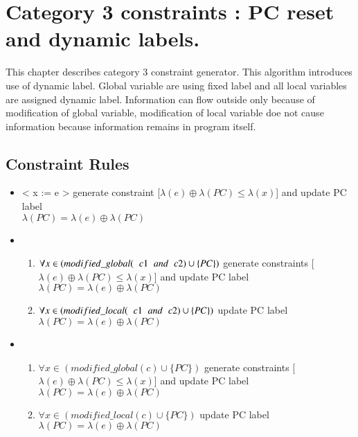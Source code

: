 \chapter{Category 3 constraints : PC reset and dynamic labels.}
\label{ch:c3}
This chapter describes category 3 constraint generator. This algorithm introduces use of dynamic label. Global variable are using fixed label and all local variables are assigned dynamic label. Information can flow outside only because of modification of global variable, modification of local variable doe not cause information because information remains in program itself.   
\section{Constraint Rules}
\begin{itemize}
	\item < x := e > generate constraint [$\lambda(e)\oplus\lambda(PC)\le\lambda(x)$] and update PC label\\ $\lambda(PC) = \lambda(e)\oplus\lambda(PC)$ 
	\item < if e then c1 else c2> \begin{enumerate}
		\item $\forall  x \in ( modified\_global(\hspace{0.2cm} c1 \hspace{0.2cm}and \hspace{0.2cm} c2) \cup \{PC\} )$ generate constraints [$\lambda(e)\oplus\lambda(PC)\le\lambda(x)$] and update PC label $\lambda(PC) = \lambda(e)\oplus\lambda(PC)$
		\item $\forall x \in ( modified\_local(\hspace{0.2cm} c1 \hspace{0.2cm}and \hspace{0.2cm} c2) \cup \{PC\} )$ update PC label $\lambda(PC) = \lambda(e)\oplus\lambda(PC)$
	\end{enumerate}
	\item < while e do c > \begin{enumerate}
		\item $\forall  x \in ( modified\_global(c) \cup \{PC\} )$ generate constraints [$\lambda(e)\oplus\lambda(PC)\le\lambda(x)$] and update PC label $\lambda(PC) = \lambda(e)\oplus\lambda(PC)$
		\item $\forall x \in ( modified\_local(c) \cup \{PC\} )$ update PC label $\lambda(PC) = \lambda(e)\oplus\lambda(PC)$
	\end{enumerate}
\end{itemize} 
